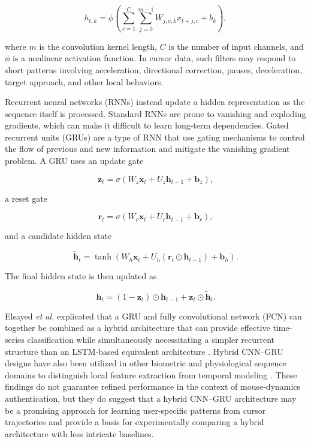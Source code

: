 \documentclass[conference]{IEEEtran}
\begin{document}
\begin{equation}
h_{t,k}
=
\phi
\left(
\sum_{c=1}^{C}
\sum_{j=0}^{m-1}
W_{j,c,k}x_{t+j,c}
+
b_k
\right),
\label{eq:temporal_convolution}
\end{equation}

where $m$ is the convolution kernel length, $C$ is the number of input channels, and $\phi$ is a nonlinear activation function. In cursor data, such filters may respond to short patterns involving acceleration, directional correction, pauses, deceleration, target approach, and other local behaviors. 

Recurrent neural networks (RNNs) instead update a hidden representation as the sequence itself is processed. Standard RNNs are prone to vanishing and exploding gradients, which can make it difficult to learn long-term dependencies. Gated recurrent units (GRUs) are a type of RNN that use gating mechanisms to control the flow of previous and new information and mitigate the vanishing gradient problem. A GRU uses an update gate

\begin{equation}
\mathbf{z}_t
=
\sigma
\left(
W_z\mathbf{x}_t
+
U_z\mathbf{h}_{t-1}
+
\mathbf{b}_z
\right),
\end{equation}

a reset gate 

\begin{equation}
\mathbf{r}_t
=
\sigma
\left(
W_r\mathbf{x}_t
+
U_r\mathbf{h}_{t-1}
+
\mathbf{b}_r
\right),
\end{equation}

and a candidate hidden state

\begin{equation}
\widetilde{\mathbf{h}}_t
=
\tanh
\left(
W_h\mathbf{x}_t
+
U_h
\left(
\mathbf{r}_t \odot \mathbf{h}_{t-1}
\right)
+
\mathbf{b}_h
\right).
\end{equation}

The final hidden state is then updated as

\begin{equation}
\mathbf{h}_t
=
(1-\mathbf{z}_t) \odot \mathbf{h}_{t-1}
+
\mathbf{z}_t\odot\widetilde{\mathbf{h}}_t.
\label{eq:gru_hidden_state}
\end{equation}

Elsayed \textit{et al.} explicated that a GRU and fully convolutional network (FCN) can together be combined as a hybrid architecture that can provide effective time-series classification while simultaneously necessitating a simpler recurrent structure than an LSTM-based equivalent architecture \cite{elsayedGRUFCN}. Hybrid CNN--GRU designs have also been utilized in other biometric and physiological sequence domains to distinguish local feature extraction from temporal modeling \cite{bangCNNGRU}. These findings do not guarantee refined performance in the context of mouse-dynamics authentication, but they do suggest that a hybrid CNN--GRU architecture may be a promising approach for learning user-specific patterns from cursor trajectories and provide a basis for experimentally comparing a hybrid architecture with less intricate baselines.
\end{document}
